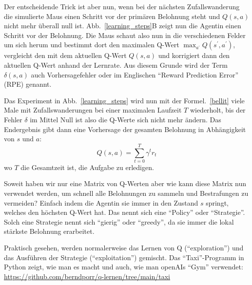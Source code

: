 \documentclass[12pt]{article}
\begin{document}
Der entscheidende Trick ist aber nun, wenn bei der nächsten
Zufallswanderung die simulierte Maus einen Schritt vor der primären
Belohnung steht und $Q(s,a)$ nicht mehr überall null
ist. Abb.~\ref{learning_steps}B zeigt nun die Agentin einen Schritt
vor der Belohnung. Die Maus schaut also nun in die verschiedenen
Felder um sich herum und bestimmt dort den maximalen Q-Wert
$\max_{a^\prime} Q(s^\prime,a^\prime)$, vergleicht den mit dem
aktuellen Q-Wert $Q(s,a)$ und korrigiert dann den aktuellen Q-Wert
anhand der Lernrate. Aus diesem Grunde wird der Term $\delta(s,a)$
auch Vorhersagefehler oder im Englischen ``Reward Prediction Error''
(RPE) genannt.

Das Experiment in Abb.~\ref{learning_steps} wird nun mit der
Formel.~\ref{bellit} viele Male mit Zufallswanderungen bei einer
maximalen Laufzeit $T$ wiederholt, bis der Fehler $\delta$ im Mittel
Null ist also die Q-Werte sich nicht mehr ändern. Das Endergebnis gibt
dann eine Vorhersage der gesamten Belohnung in Abhängigkeit von $s$
und $a$:
\begin{equation}
  Q(s,a) = \sum_{t=0}^T \gamma^t r_t
\end{equation}
wo $T$ die Gesamtzeit ist, die Aufgabe zu erledigen.

Soweit haben wir nur eine Matrix von Q-Werten aber wie kann diese
Matrix nun verwendet werden, um schnell alle Belohnungen zu sammeln
und Bestrafungen zu vermeiden? Einfach indem die Agentin sie immer in
den Zustand $s$ springt, welches den höchsten Q-Wert hat. Das nennt
sich eine ``Policy'' oder ``Strategie''. Solch eine Strategie
nennt sich ``gierig'' oder ``greedy'', da sie immer die lokal stärkste
Belohnung erarbeitet.

Praktisch gesehen, werden normalerweise das Lernen von Q
(``exploration'') und das Ausführen der Strategie (``exploitation'')
gemischt. Das ``Taxi''-Programm in Python zeigt, wie man es macht
und auch, wie man openAIs ``Gym'' verwendet:
\url{https://github.com/berndporr/q-lernen/tree/main/taxi}
\end{document}
